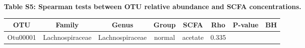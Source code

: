 \documentclass[11pt,]{article}
\begin{document}
\newpage

\textbf{Table S5: Spearman tests between OTU relative abundance and SCFA
concentrations.}

\scriptsize

\begin{longtable}[]{@{}cccccccc@{}}
\toprule
\begin{minipage}[b]{0.08\columnwidth}\centering\strut
OTU\strut
\end{minipage} & \begin{minipage}[b]{0.15\columnwidth}\centering\strut
Family\strut
\end{minipage} & \begin{minipage}[b]{0.15\columnwidth}\centering\strut
Genus\strut
\end{minipage} & \begin{minipage}[b]{0.08\columnwidth}\centering\strut
Group\strut
\end{minipage} & \begin{minipage}[b]{0.09\columnwidth}\centering\strut
SCFA\strut
\end{minipage} & \begin{minipage}[b]{0.07\columnwidth}\centering\strut
Rho\strut
\end{minipage} & \begin{minipage}[b]{0.08\columnwidth}\centering\strut
P-value\strut
\end{minipage} & \begin{minipage}[b]{0.08\columnwidth}\centering\strut
BH\strut
\end{minipage}\tabularnewline
\midrule
\endhead
\begin{minipage}[t]{0.08\columnwidth}\centering\strut
Otu00001\strut
\end{minipage} & \begin{minipage}[t]{0.15\columnwidth}\centering\strut
Lachnospiraceae\strut
\end{minipage} & \begin{minipage}[t]{0.15\columnwidth}\centering\strut
Lachnospiraceae\strut
\end{minipage} & \begin{minipage}[t]{0.08\columnwidth}\centering\strut
normal\strut
\end{minipage} & \begin{minipage}[t]{0.09\columnwidth}\centering\strut
acetate\strut
\end{minipage} & \begin{minipage}[t]{0.07\columnwidth}\centering\strut
0.335\strut
\end{minipage} & \begin{minipage}[t]{0.08\columnwidth}\centering\strut

\end{minipage}
\end{longtable}
\end{document}
